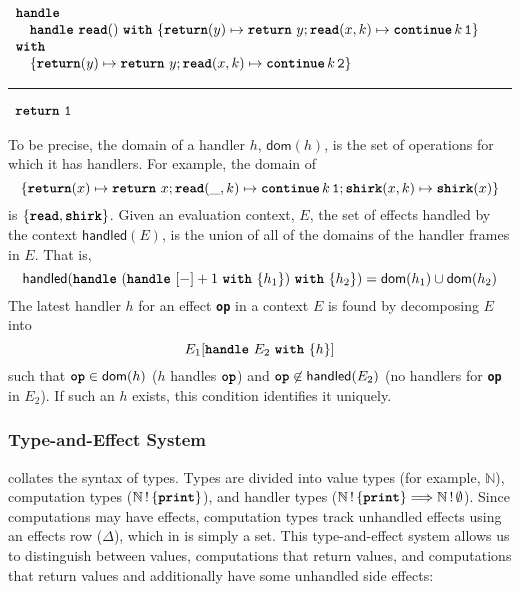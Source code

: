 \begin{eff}
$\begin{array}{l}
  \textbf{\texttt{handle}} \\
  \quad \handleWith{\textbf{\texttt{read}}()}{\returnHandler{y}{\return{y}}; \textbf{\texttt{read}}(x, k) \mapsto {\continue{k}{\texttt{1}}}} \\
  \textbf{\texttt{with}} \\ 
  \quad \{ \returnHandler{y}{\return{y}}; \textbf{\texttt{read}}(x, k) \mapsto {\continue{k}{\texttt{2}}} \}
\end{array}$ 

\vspace{2mm} 
\textcolor{effComment}{\hrule height 0.2mm \relax}
\vspace{2mm} 

\textcolor{effComment}{$\begin{array}{l}\return{\texttt{1}}\end{array}$}
\end{eff}

To be precise, the domain of a handler $h$, $\textsf{dom}(h)$, is the set of operations for which it has handlers. For example, the domain of 
\[\{ \returnHandler{x}{\return{x}}; \textbf{\texttt{read}}(\_, k) \mapsto \continue{k}{\texttt{1}}; \textbf{\texttt{shirk}}(x, k) \mapsto \textbf{\texttt{shirk}}(x)
\} \] 
is $\{ \textbf{\texttt{read}}, \textbf{\texttt{shirk}} \}$.
Given an evaluation context, $E$, the set of effects handled by the context $\textsf{handled}(E)$, is the union of all of the domains of the handler frames in $E$. That is, 
\[\textsf{handled}(\handleWith{(\handleWith{[-]+1}{h_1})}{h_2}) = \textsf{dom}(h_1) \cup \textsf{dom}(h_2)\]
The latest handler $h$ for an effect \textbf{\texttt{op}} in a context $E$ is found by decomposing $E$ into 
\[E_1[\handleWith{E_2}{h}]\]
such that $\textbf{\texttt{op}} \in \textsf{dom}(h)$ ($h$ handles $\textbf{\texttt{op}}$) and $\textbf{\texttt{op}} \not\in \textsf{handled}(E_2)$ (no handlers for \textbf{\texttt{op}} in $E_2$). If such an $h$ exists, this condition identifies it uniquely. 
\subsubsection{Type-and-Effect System}
 collates the syntax of \efflang{} types. Types are divided into value types (for example, $\mathbb{N}$), computation types ($\effectType[\{\textbf{\texttt{print}} \}]{\mathbb{N}}$), and handler types ($\handlerType{\effectType[\{\textbf{\texttt{print}} \}]{\mathbb{N}}}{\effectType[\emptyset]{\mathbb{N}}}$). Since computations may have effects, computation types track unhandled effects using an effects row ($\Delta$), which in \efflang{} is simply a set. This type-and-effect system allows us to distinguish between values, computations that return values, and computations that return values and additionally have some unhandled side effects:


